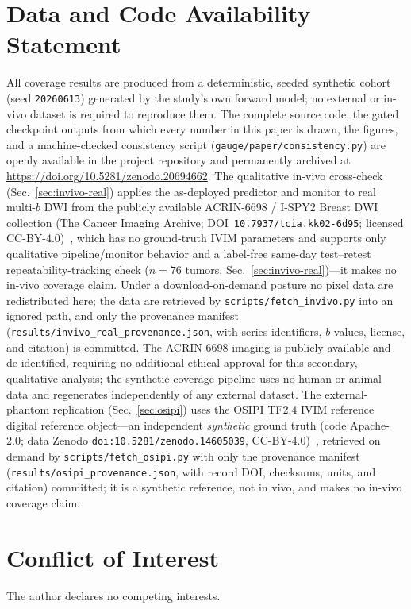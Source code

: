 \documentclass[11pt]{article}
\begin{document}
\section*{Data and Code Availability Statement}
All coverage results are produced from a deterministic, seeded synthetic cohort
(seed \texttt{20260613}) generated by the study's own forward model; no external or
in-vivo dataset is required to reproduce them. The complete source code, the gated
checkpoint outputs from which every number in this paper is drawn, the figures, and
a machine-checked consistency script (\texttt{gauge/paper/consistency.py}) are
openly available in the project repository and permanently archived at
\href{https://doi.org/10.5281/zenodo.20694662}{https://doi.org/10.5281/zenodo.20694662}.
The qualitative in-vivo cross-check (Sec.~\ref{sec:invivo-real}) applies the
as-deployed predictor and monitor to real multi-$b$ DWI from the publicly available
ACRIN-6698 / I-SPY2 Breast DWI collection (The Cancer Imaging Archive;
DOI~\texttt{10.7937/tcia.kk02-6d95}; licensed CC-BY-4.0)~\cite{acrin6698,clark2013tcia},
which has no ground-truth IVIM parameters and supports only qualitative
pipeline/monitor behavior and a label-free same-day test--retest
repeatability-tracking check ($n{=}76$ tumors, Sec.~\ref{sec:invivo-real})---it
makes no in-vivo coverage claim. Under a
download-on-demand posture no pixel data are redistributed here; the data are
retrieved by \texttt{scripts/fetch\_invivo.py} into an ignored path, and only the
provenance manifest (\texttt{results/invivo\_real\_provenance.json}, with series
identifiers, $b$-values, license, and citation) is committed. The ACRIN-6698 imaging
is publicly available and de-identified, requiring no additional ethical approval for
this secondary, qualitative analysis; the synthetic coverage pipeline uses no human
or animal data and regenerates independently of any external dataset.
The external-phantom replication (Sec.~\ref{sec:osipi}) uses the OSIPI TF2.4 IVIM
reference digital reference object---an independent \emph{synthetic} ground truth
(code Apache-2.0; data Zenodo \texttt{doi:10.5281/zenodo.14605039},
CC-BY-4.0)~\cite{osipi_ivim}, retrieved on demand by \texttt{scripts/fetch\_osipi.py}
with only the provenance manifest (\texttt{results/osipi\_provenance.json}, with
record DOI, checksums, units, and citation) committed; it is a synthetic reference,
not in vivo, and makes no in-vivo coverage claim.

\section*{Conflict of Interest}
The author declares no competing interests.
\end{document}
